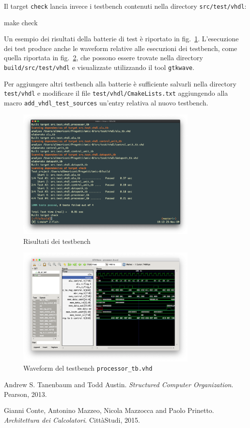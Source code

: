 \documentclass[a4paper,12pt]{scrreprt}
\begin{document}
Il target \lstinline{check} lancia invece i testbench contenuti nella directory
\lstinline{src/test/vhdl}:
\begin{commandshell}
  make check
\end{commandshell}

Un esempio dei risultati della batterie di test è riportato in
fig.~\ref{fig:test}. L'esecuzione dei test produce anche le waveform relative
alle esecuzioni dei testbench, come quella riportata in fig.~\ref{fig:waveform},
che possono essere trovate nella directory \lstinline{build/src/test/vhdl} e
visualizzate utilizzando il tool \lstinline{gtkwave}.

Per aggiungere altri testbench alla batterie è sufficiente salvarli nella
directory \lstinline{test/vhdl} e modificare il file
\lstinline{test/vhdl/CmakeLists.txt} aggiungendo alla macro
\lstinline{add_vhdl_test_sources} un'entry relativa al nuovo testbench.

\begin{figure}
  \centering
  \includegraphics[width=0.8\textwidth]{test.png}
  \caption{Risultati dei testbench}\label{fig:test}
\end{figure}

\begin{figure}
  \centering
  \includegraphics[width=0.8\textwidth]{waveform.png}
  \caption{Waveform del testbench \lstinline{processor_tb.vhd}}\label{fig:waveform}
\end{figure}

\begin{thebibliography}{2}
  Andrew S. Tanenbaum and Todd Austin.
  \textit{Structured Computer Organization}.
  Pearson, 2013.

  Gianni Conte, Antonino Mazzeo, Nicola Mazzocca and Paolo Prinetto.
  \textit{Architettura dei Calcolatori}.
  CittàStudi, 2015.
\end{thebibliography}
\end{document}
